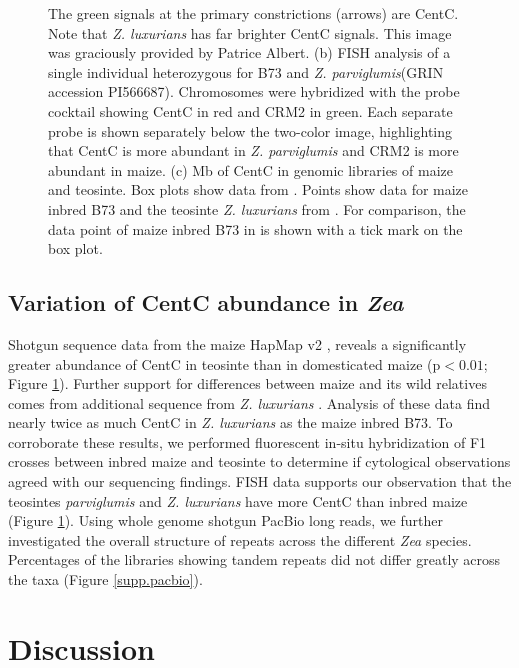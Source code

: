 \begin{figure}
{The green signals at the primary constrictions (arrows) are CentC.
Note that \emph{Z. luxurians} has far brighter CentC signals.
This image was graciously provided by Patrice Albert.
(b) FISH analysis of a single individual heterozygous for B73 and \emph{Z. parviglumis}(GRIN accession PI566687).
Chromosomes were hybridized with the \citet{Shi2010} probe cocktail showing CentC in red and CRM2 in green. 
Each separate probe is shown separately below the two-color image, highlighting that CentC is more abundant in \emph{Z. parviglumis} and CRM2 is more abundant in maize. 
(c)  Mb of CentC in genomic libraries of maize and teosinte. 
Box plots show data from \citet{Chia2012}. 
Points show data for maize inbred B73 and the teosinte \emph{Z. luxurians} from \citet{Tenaillon2011}. For comparison, the data point of maize inbred B73 in \citet{Chia2012} is shown with a tick mark on the box plot.
}
\label{abundance}    
\end{figure}

\subsection*{Variation of CentC abundance in \emph{Zea}}

Shotgun sequence data from the maize HapMap v2 \citep{Chia2012}, reveals a significantly greater abundance of CentC in teosinte than in domesticated maize (p$<0.01$; Figure \ref{abundance}).   
Further support for differences between maize and its wild relatives comes from additional  sequence  from \emph{Z. luxurians} \citep{Tenaillon2011}.  
Analysis of these data find nearly twice as much CentC in \emph{Z. luxurians} as the maize inbred B73.  
To corroborate these results, we performed fluorescent in-situ hybridization of F1 crosses between inbred maize and teosinte to determine if cytological observations agreed with our sequencing findings.   
FISH data supports our observation that the teosintes \emph{parviglumis} and \emph{Z. luxurians} have more CentC than inbred maize (Figure \ref{abundance}).
Using whole genome shotgun PacBio long reads, we further investigated the overall structure of repeats across the different \emph{Zea} species.
Percentages of the libraries showing tandem repeats did not differ greatly across the taxa (Figure \ref{supp.pacbio}).

\section*{Discussion}
\label{discussion}

